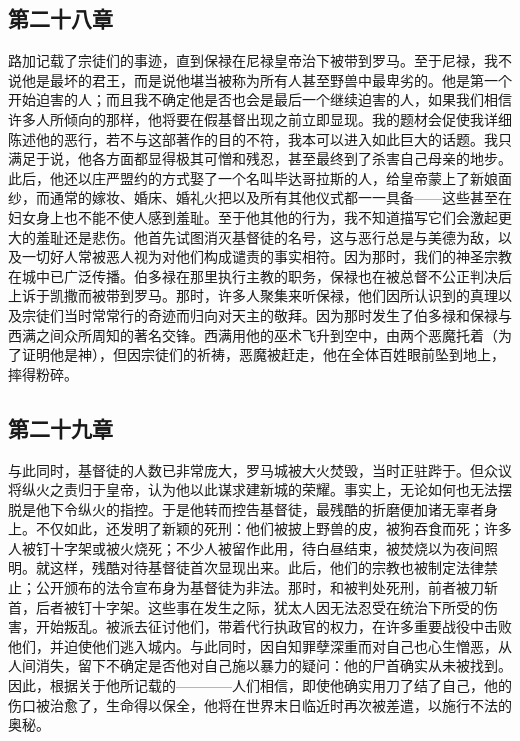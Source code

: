 
\subsection{第二十八章}

路加记载了宗徒们的事迹，直到保禄在尼禄皇帝治下被带到罗马。至于尼禄，我不说他是最坏的君王，而是说他堪当被称为所有人甚至野兽中最卑劣的。他是第一个开始迫害的人；而且我不确定他是否也会是最后一个继续迫害的人，如果我们相信许多人所倾向的那样，他将要在假基督出现之前立即显现。我的题材会促使我详细陈述他的恶行，若不与这部著作的目的不符，我本可以进入如此巨大的话题。我只满足于说，他各方面都显得极其可憎和残忍，甚至最终到了杀害自己母亲的地步。此后，他还以庄严盟约的方式娶了一个名叫毕达哥拉斯的人，给皇帝蒙上了新娘面纱，而通常的嫁妆、婚床、婚礼火把以及所有其他仪式都一一具备——这些甚至在妇女身上也不能不使人感到羞耻。至于他其他的行为，我不知道描写它们会激起更大的羞耻还是悲伤。他首先试图消灭基督徒的名号，这与恶行总是与美德为敌，以及一切好人常被恶人视为对他们构成谴责的事实相符。因为那时，我们的神圣宗教在城中已广泛传播。伯多禄在那里执行主教的职务，保禄也在被总督不公正判决后上诉于凯撒而被带到罗马。那时，许多人聚集来听保禄，他们因所认识到的真理以及宗徒们当时常常行的奇迹而归向对天主的敬拜。因为那时发生了伯多禄和保禄与西满之间众所周知的著名交锋。西满用他的巫术飞升到空中，由两个恶魔托着（为了证明他是神），但因宗徒们的祈祷，恶魔被赶走，他在全体百姓眼前坠到地上，摔得粉碎。\par


\subsection{第二十九章}

与此同时，基督徒的人数已非常庞大，罗马城被大火焚毁，当时正驻跸于。但众议将纵火之责归于皇帝，认为他以此谋求建新城的荣耀。事实上，无论如何也无法摆脱是他下令纵火的指控。于是他转而控告基督徒，最残酷的折磨便加诸无辜者身上。不仅如此，还发明了新颖的死刑：他们被披上野兽的皮，被狗吞食而死；许多人被钉十字架或被火烧死；不少人被留作此用，待白昼结束，被焚烧以为夜间照明。就这样，残酷对待基督徒首次显现出来。此后，他们的宗教也被制定法律禁止；公开颁布的法令宣布身为基督徒为非法。那时，和被判处死刑，前者被刀斩首，后者被钉十字架。这些事在发生之际，犹太人因无法忍受在统治下所受的伤害，开始叛乱。被派去征讨他们，带着代行执政官的权力，在许多重要战役中击败他们，并迫使他们逃入城内。与此同时，因自知罪孽深重而对自己也心生憎恶，从人间消失，留下不确定是否他对自己施以暴力的疑问：他的尸首确实从未被找到。因此，根据关于他所记载的————人们相信，即使他确实用刀了结了自己，他的伤口被治愈了，生命得以保全，他将在世界末日临近时再次被差遣，以施行不法的奥秘。\par

